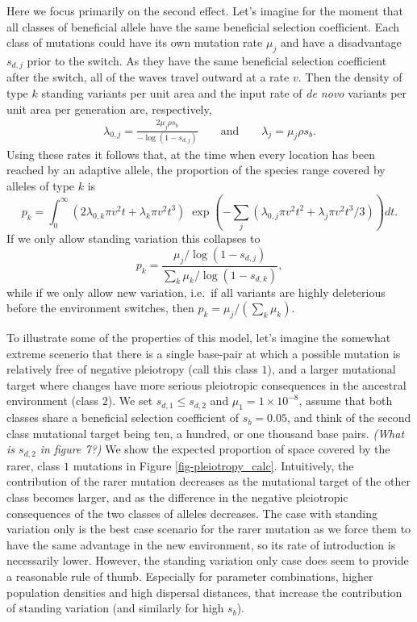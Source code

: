 \documentclass{article}
\newcommand{\plr}[1]{{\it\color{blue}(#1)}}
\begin{document}
Here we focus primarily on the second effect. 
Let's imagine for the moment that all classes of beneficial allele 
have the same beneficial selection coefficient. 
Each class of mutations could have its own mutation rate $\mu_j$ and
have a disadvantage $s_{d,j}$ prior to the switch. 
As they have the same beneficial selection coefficient after the switch, 
all of the waves travel outward at a rate $v$. 
Then the density of type $k$ standing variants per unit area 
and the input rate of \textit{de novo} variants per unit area per generation are, respectively,
\begin{align}
  \lambda_{0,j} = \frac{ 2 \mu_j \rho s_b }{ -\log(1-s_{d,j}) } \qquad \text{and} \qquad    \lambda_{j} = \mu_j \rho s_b .
\end{align}
Using these rates it follows that, at the time when every location has been reached by an adaptive allele,
the proportion of the species range covered by alleles of type $k$ is
\begin{equation} \label{eqn-prop-space-allele-k}
    p_k = \int_0^\infty  \left( 2 \lambda_{0,k} \pi v^2 t + \lambda_k \pi v^2 t^3 \right)  
    \; \exp \left( - \sum_j ( \lambda_{0,j} \pi v^2 t^2 + \lambda_j \pi v^2 t^3 / 3 ) \right) dt .
\end{equation}
If we only allow standing variation this collapses to 
\begin{equation}  \label{eqn-prop-space-allele-k-standing-room-only}
    p_k = \frac{  \mu_j / \log(1-s_{d,j}) }{\sum_k  \mu_k / \log(1-s_{d,k}) } ,
\end{equation}
while if we only allow new variation, 
i.e.\ if all variants are highly deleterious before the environment switches, 
then $p_k =\mu_j / (\sum_k  \mu_k)$.

To illustrate some of the properties of this model, 
let's imagine the somewhat extreme scenerio that there is a single base-pair 
at which a possible mutation is relatively free of negative pleiotropy (call this class $1$), 
and a larger mutational target where changes 
have more serious pleiotropic consequences in the ancestral environment (class $2$). 
We set $s_{d,1} \leq s_{d,2}$ and $\mu_1=1 \times 10^{-8}$, 
assume that both classes share a beneficial selection coefficient of $s_b=0.05$,
and think of the second class mutational target being ten, a hundred, or one thousand base pairs. 
\plr{What is $s_{d,2}$ in figure 7?}
We show the expected proportion of space covered by
the rarer, class $1$ mutations in Figure \ref{fig-pleiotropy_calc}.
Intuitively, the contribution of the rarer mutation decreases as the
mutational target of the other class becomes larger, and as the
difference in the negative pleiotropic consequences of the two classes of alleles decreases. 
The case with standing variation only is the best case scenario 
for the rarer mutation as we force them to have the same advantage in the new environment, 
so its rate of introduction is necessarily lower. 
However, the standing variation only case does seem to provide a reasonable rule of thumb. 
Especially for parameter combinations, 
higher population densities and high dispersal distances, 
that increase the contribution of standing variation (and similarly for high $s_b$). 
\end{document}
